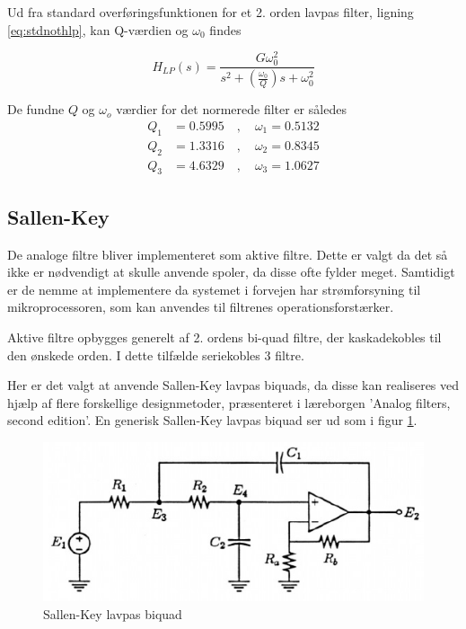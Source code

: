 Ud fra standard overføringsfunktionen for et 2. orden lavpas filter, ligning \ref{eq:stdnothlp}, kan Q-værdien og $\omega_0$ findes 

\begin{equation}
\label{eq:stdnothlp}
H_{LP}(s) = \frac{G\omega_0^2}{s^2 + \left(\frac{\omega_0}{Q}\right)s + \omega_0^2}
\end{equation}

De fundne $Q$ og $\omega_o$ værdier for det normerede filter er således
\begin{align}
	Q_1 &= \num{0.5995} \quad , \quad \omega_1= \num{0.5132} \nonumber \\
	Q_2 &= \num{1.3316} \quad , \quad \omega_2= \num{0.8345} \nonumber \\
	Q_3 &= \num{4.6329} \quad , \quad \omega_3= \num{1.0627} \label{eq:q_and_w_norm}
\end{align}

\subsection{Sallen-Key}

De analoge filtre bliver implementeret som aktive filtre. Dette er valgt da det så ikke er nødvendigt at skulle anvende spoler, da disse ofte fylder meget.
Samtidigt er de nemme at implementere da systemet i forvejen har strømforsyning til mikroprocessoren, som kan anvendes til filtrenes operationsforstærker.

Aktive filtre opbygges generelt af 2. ordens bi-quad filtre, der kaskadekobles til den ønskede orden.
I dette tilfælde seriekobles 3 filtre. 


Her er det valgt at anvende Sallen-Key lavpas biquads,
da disse kan realiseres ved hjælp af flere forskellige designmetoder, præsenteret 
i læreborgen 'Analog filters, second edition'\cite{KendallSu}.
En generisk Sallen-Key lavpas biquad ser ud som i figur \ref{fig:sklpbq}.

\begin{figure}[H]
	\centering
	\includegraphics[width=.6\textwidth]{billeder/sklpbq}
	\caption{Sallen-Key lavpas biquad \cite{KendallSu}}
	\label{fig:sklpbq}
\end{figure}

